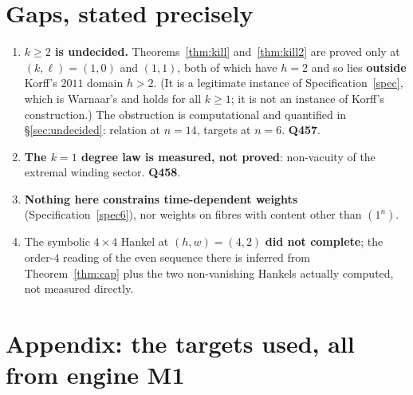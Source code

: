 \documentclass[11pt]{article}
\theoremstyle{plain}
\theoremstyle{definition}
\theoremstyle{remark}
\begin{document}
\section{Gaps, stated precisely}

\begin{enumerate}
\item \textbf{$k\ge2$ is undecided.} Theorems~\ref{thm:kill} and~\ref{thm:kill2} are proved
only at $(k,\ell)=(1,0)$ and $(1,1)$, both of which have $h=2$ and so lies \textbf{outside} Korff's $2011$ domain $h>2$. (It
is a legitimate instance of Specification~\ref{spec}, which is Warnaar's and holds for all
$k\ge1$; it is not an instance of Korff's construction.) The obstruction is computational and
quantified in \S\ref{sec:undecided}: relation at $n=14$, targets at $n=6$. \textbf{Q457}.
\item \textbf{The $k=1$ degree law is measured, not proved}: non-vacuity of the extremal
winding sector. \textbf{Q458}.
\item \textbf{Nothing here constrains time-dependent weights} (Specification~\ref{spec6}), nor
weights on fibres with content other than $(1^n)$.
\item The symbolic $4\times4$ Hankel at $(h,w)=(4,2)$ \textbf{did not complete}; the order-$4$
reading of the even sequence there is inferred from Theorem~\ref{thm:cap} plus the two
non-vanishing Hankels actually computed, not measured directly.
\end{enumerate}

\section*{Appendix: the targets used, all from engine M1}
\end{document}
